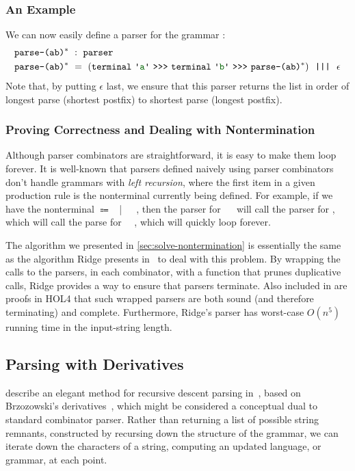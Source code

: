     \subsubsection{An Example}
    
      We can now easily define a parser for the grammar :
\begin{align*}
&\fname{parse-\regex{(ab)\ensuremath{^*}}}~:~\fname{parser} \\
&\fname{parse-\regex{(ab)\ensuremath{^*}}}~=~(\fname{terminal}~\terminal{a}~\sequencing~\fname{terminal}~\terminal{b}~\sequencing~\fname{parse-\regex{(ab)\ensuremath{^*}}})~~\fname{|||}~~\epsilon
\end{align*}
      Note that, by putting $\epsilon$ last, we ensure that this parser returns the list in order of longest parse (shortest postfix) to shortest parse (longest postfix).
      
    \subsubsection{Proving Correctness and Dealing with Nontermination}
      Although parser combinators are straightforward, it is easy to make them loop forever.  It is well-known that parsers defined naively using parser combinators don't handle grammars with \emph{left recursion}, where the first item in a given production rule is the nonterminal currently being defined.  For example, if we have the nonterminal  $\Coloneqq$ ~|~~\terminal{+}~, then the parser for ~\terminal{+}~ will call the parser for , which will call the parse for ~\terminal{+}~, which will quickly loop forever.
      
      The algorithm we presented in \autoref{sec:solve-nontermination} is essentially the same as the algorithm Ridge presents in~\cite{Ridge} to deal with this problem.  By wrapping the calls to the parsers, in each combinator, with a function that prunes duplicative calls, Ridge provides a way to ensure that parsers terminate.  Also included in \cite{Ridge} are proofs in HOL4 that such wrapped parsers are both sound (and therefore terminating) and complete.  Furthermore, Ridge's parser has worst-case $O(n^5)$ running time in the input-string length.

  \subsection{Parsing with Derivatives}
     describe an elegant method for recursive descent parsing in~\cite{Derivs}, based on Brzozowski's derivatives~\cite{BrzozowskiDerivs}, which might be considered a conceptual dual to standard combinator parser.  Rather than returning a list of possible string remnants, constructed by recursing down the structure of the grammar, we can iterate down the characters of a string, computing an updated language, or grammar, at each point.
    
